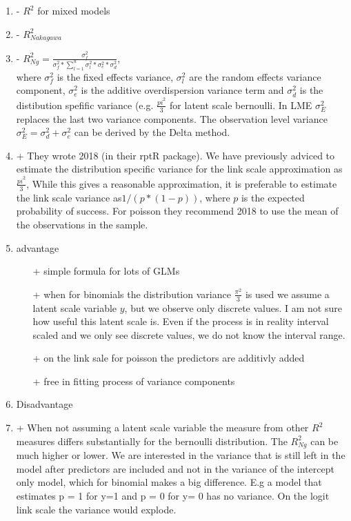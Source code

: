 \documentclass[11pt, a4paper]{article}\usepackage[]{graphicx}\usepackage[]{color}
\begin{document}
\begin {enumerate}
\item[-]{$R^2$ for mixed models}


\item[-]{$R^2_{Nakagawa}$}
\item[-]{$R^2_{Ng} = \frac{\sigma^2_{f}}{\sigma^2_{f}*\sum_{l=1}^{u}\sigma^2_{l}*\sigma^2_{e}*\sigma^2_{d}} $, \\ where $\sigma^2_{f}$ is the fixed effects variance, $\sigma^2_{l}$ are the random effects variance component, $\sigma^2_{e}$ is the additive overdispersion variance term and $\sigma^2_{d}$ is the distibution spefific variance (e.g. $\frac{pi^2}{3}$ for latent scale bernoulli. In LME $\sigma^2_{E}$ replaces the last two variance components.  The observation level variance $\sigma^2_{E} = \sigma^2_{d} + \sigma^2_{e}$ can be derived by the Delta method.}

\item[+] They wrote 2018 (in their rptR package). We have previously adviced to estimate the distribution specific variance for the link scale approximation as $\frac{pi^2}{3}$, While this gives a reasonable approximation, it is preferable to estimate the link scale variance as$ 1/(p*(1-p))$, where $p$ is the expected probability of success. For poisson they recommend 2018 to use the mean of the observations in the sample.

\item advantage

\begin{enumerate}

\item[+] simple formula for lots of GLMs

\item[+] when for binomials the distribution variance $\frac{\pi^2}{3}$ is used we assume a latent scale variable $y$, but we observe only discrete values. I am not sure how useful this latent scale is. Even if the process is in reality interval scaled and we only see discrete values, we do not know the interval range.

\item[+] on the link sale for poisson the predictors are additivly added

\item[+] free in fitting process of variance components

\end{enumerate}

\item Disadvantage

\item [+] When not assuming a latent scale variable the measure from other $R^2$ measures differs substantially for the bernoulli distribution. The $R^2_{Ng}$ can be much higher or lower. We are interested in the variance that is still left in the model after predictors are included and not in the variance of the intercept only model, which for binomial makes a big difference. E.g a model that estimates p = 1 for y=1 and p = 0 for y= 0 has no variance. On the logit link scale the variance would explode. 


\end{enumerate}
\end{document}
